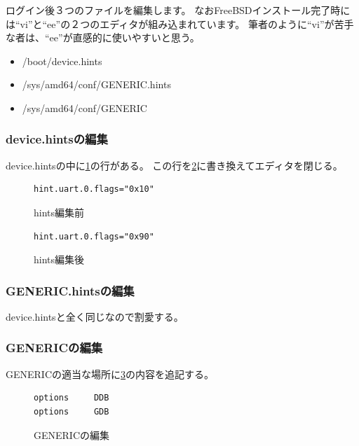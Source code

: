 \documentclass[a4j]{jarticle}
\begin{document}
\begin{multicols}{2}
ログイン後３つのファイルを編集します。
なおFreeBSDインストール完了時には``vi''と``ee''の２つのエディタが組み込まれています。
筆者のように``vi''が苦手な者は、``ee''が直感的に使いやすいと思う。
\begin{itemize}
    \item /boot/device.hints
    \item /sys/amd64/conf/GENERIC.hints
    \item /sys/amd64/conf/GENERIC
\end{itemize}

\subsubsection{device.hintsの編集}
\label{sec:FreeBSD_device.hints}
device.hintsの中に\ref{fig:FreeBSD_bf_hints}の行がある。
この行を\ref{fig:FreeBSD_af_hints}に書き換えてエディタを閉じる。
\begin{figure}[htbp]
	\begin{center}
		\begin{lstlisting}[basicstyle=\ttfamily\footnotesize, frame=single, breaklines=true]
hint.uart.0.flags="0x10"
		\end{lstlisting}
	\end{center}
	\caption{hints編集前}
	\label{fig:FreeBSD_bf_hints}
\end{figure}

\begin{figure}[htbp]
	\begin{center}
		\begin{lstlisting}[basicstyle=\ttfamily\footnotesize, frame=single, breaklines=true]
hint.uart.0.flags="0x90"
		\end{lstlisting}
	\end{center}
	\caption{hints編集後}
	\label{fig:FreeBSD_af_hints}
\end{figure}

\subsubsection{GENERIC.hintsの編集}
device.hintsと全く同じなので割愛する。

\subsubsection{GENERICの編集}
GENERICの適当な場所に\ref{fig:FreeBSD_GENERIC}の内容を追記する。
\begin{figure}[htbp]
	\begin{center}
		\begin{lstlisting}[basicstyle=\ttfamily\footnotesize, frame=single, breaklines=true]
options     DDB
options     GDB
		\end{lstlisting}
	\end{center}
	\caption{GENERICの編集}
	\label{fig:FreeBSD_GENERIC}
\end{figure}


\end{multicols}
\end{document}
